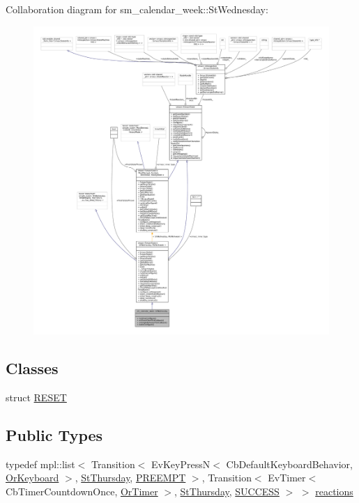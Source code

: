 Collaboration diagram for sm\+\_\+calendar\+\_\+week\+:\+:St\+Wednesday\+:
\nopagebreak
\begin{figure}[H]
\begin{center}
\leavevmode
\includegraphics[width=350pt]{structsm__calendar__week_1_1StWednesday__coll__graph}
\end{center}
\end{figure}
\subsection*{Classes}
\begin{DoxyCompactItemize}
\item 
struct \hyperlink{structsm__calendar__week_1_1StWednesday_1_1RESET}{R\+E\+S\+ET}
\end{DoxyCompactItemize}
\subsection*{Public Types}
\begin{DoxyCompactItemize}
\item 
typedef mpl\+::list$<$ Transition$<$ Ev\+Key\+PressN$<$ Cb\+Default\+Keyboard\+Behavior, \hyperlink{classsm__calendar__week_1_1OrKeyboard}{Or\+Keyboard} $>$, \hyperlink{structsm__calendar__week_1_1StThursday}{St\+Thursday}, \hyperlink{classPREEMPT}{P\+R\+E\+E\+M\+PT} $>$, Transition$<$ Ev\+Timer$<$ Cb\+Timer\+Countdown\+Once, \hyperlink{classsm__calendar__week_1_1OrTimer}{Or\+Timer} $>$, \hyperlink{structsm__calendar__week_1_1StThursday}{St\+Thursday}, \hyperlink{classSUCCESS}{S\+U\+C\+C\+E\+SS} $>$ $>$ \hyperlink{structsm__calendar__week_1_1StWednesday_aa21e502e00fa09b841f8693bdb05e86d}{reactions}
\end{DoxyCompactItemize}

